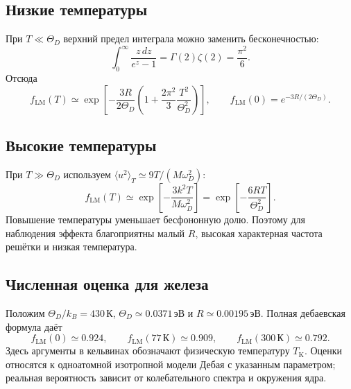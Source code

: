 \documentclass[../final.tex]{subfiles}
\begin{document}
\subsection{Низкие температуры}
При $T\ll\Theta_D$ верхний предел интеграла можно заменить бесконечностью:
\begin{equation*}
 \int_0^\infty\frac{z\,dz}{e^z-1}=\Gamma(2)\zeta(2)=\frac{\pi^2}{6}.
\end{equation*}
Отсюда
\begin{equation*}
 f_{\mathrm{LM}}(T)\simeq
 \exp\!\left[-\frac{3R}{2\Theta_D}
 \left(1+\frac{2\pi^2}{3}\frac{T^2}{\Theta_D^2}\right)\right],
 \qquad f_{\mathrm{LM}}(0)=e^{-3R/(2\Theta_D)}.
\end{equation*}

\subsection{Высокие температуры}
При $T\gg\Theta_D$ используем
$\langle u^2\rangle_T\simeq9T/(M\omega_D^2)$:
\begin{equation*}
 f_{\mathrm{LM}}(T)\simeq
 \exp\!\left[-\frac{3k^2T}{M\omega_D^2}\right]
 =\exp\!\left[-\frac{6RT}{\Theta_D^2}\right].
\end{equation*}
Повышение температуры уменьшает бесфононную долю.
Поэтому для наблюдения эффекта благоприятны малый $R$, высокая
характерная частота решётки и низкая температура.

\subsection{Численная оценка для железа}
Положим $\Theta_D/k_B=430\,\text{К}$,
$\Theta_D\simeq0.0371\,\text{эВ}$ и $R\simeq0.00195\,\text{эВ}$.
Полная дебаевская формула даёт
\begin{equation*}
 f_{\mathrm{LM}}(0)\simeq0.924,\qquad
 f_{\mathrm{LM}}(77\,\text{К})\simeq0.909,\qquad
 f_{\mathrm{LM}}(300\,\text{К})\simeq0.792.
\end{equation*}
Здесь аргументы в кельвинах обозначают физическую температуру $T_{\mathrm K}$.
Оценки относятся к одноатомной изотропной модели Дебая с указанным
параметром; реальная вероятность зависит от колебательного спектра
и окружения ядра.
\end{document}
